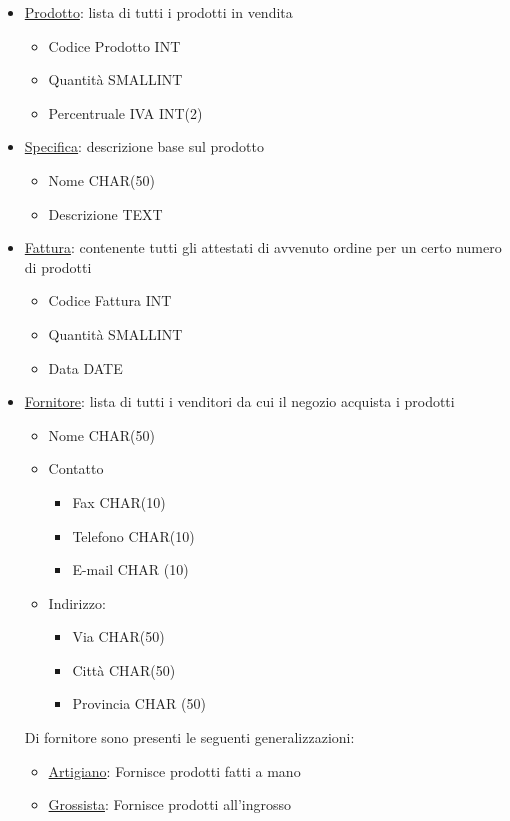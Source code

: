 \begin{itemize}
\item \underline{Prodotto}: lista di tutti i prodotti in vendita
  \begin{itemize}
  \item Codice Prodotto INT
  \item Quantit\`a SMALLINT
  \item Percentruale IVA INT(2)
  \end{itemize}

\item \underline{Specifica}: descrizione base sul prodotto
  \begin{itemize}
  \item Nome CHAR(50)
  \item Descrizione TEXT
  \end{itemize}

\item \underline{Fattura}: contenente tutti gli attestati di avvenuto ordine per un certo numero di prodotti
  \begin{itemize}
  \item Codice Fattura INT
  \item Quantit\`a SMALLINT
  \item Data DATE
  \end{itemize}

\item \underline{Fornitore}: lista di tutti i venditori da cui il negozio acquista i prodotti
  \begin{itemize}
  \item Nome CHAR(50)
  \item Contatto
    \begin{itemize}
    \item Fax CHAR(10)
    \item Telefono CHAR(10)
    \item E-mail CHAR (10)
    \end{itemize}

  \item Indirizzo:
    \begin{itemize}
    \item Via CHAR(50)
    \item Citt\`a CHAR(50)
    \item Provincia CHAR (50)
    \end{itemize}
  \end{itemize}
  Di fornitore sono presenti le seguenti generalizzazioni:
  \begin{itemize}
  \item \underline{Artigiano}: Fornisce prodotti fatti a mano
  \item \underline{Grossista}: Fornisce prodotti all'ingrosso
  \end{itemize}


\end{itemize}
